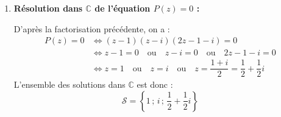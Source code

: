 \documentclass[12pt,a4paper]{article}
\begin{document}
\begin{enumerate}
    Comme $\deg(P) = 3$ et $\deg\left[(z - 1)(z - i)\right] = 2$, le polynôme $g$ est de degré $1$. Il existe donc deux nombres complexes $a$ et $b$ tels que pour tout $z \in \mathbb{C}$, $g(z) = az + b$. Développons $(z - 1)(z - i)(az + b)$ :
    $$
    \begin{aligned}
        (z - 1)(z - i)(az + b) &= \left[z^2 - (1 + i)z + i\right](az + b) \\
        &= az^3 + bz^2 - a(1 + i)z^2 - b(1 + i)z + aiz + bi \\
        &= az^3 + \left[b - a(1 + i)\right]z^2 + \left[ai - b(1 + i)\right]z + bi
    \end{aligned}
    $$
    Par identification avec $P(z) = 2z^3 - 3(1 + i)z^2 + 4iz + 1 - i$, on obtient le système :
    $$
    \begin{aligned}
        \left\{
        \begin{array}{l}
            a = 2 \\
            b - a(1 + i) = -3(1 + i) \\
            ai - b(1 + i) = 4i \\
            bi = 1 - i
        \end{array}
        \right.
        &\iff
        \left\{
        \begin{array}{l}
            a = 2 \\
            b = -3(1 + i) + 2(1 + i) = -(1 + i) = -1 - i \\
            2i - (-1 - i)(1 + i) = 2i + (1 + i)^2 = 2i + 2i = 4i \quad \text{(vérifié)} \\
            (-1 - i)i = -i - i^2 = 1 - i \quad \text{(vérifié)}
        \end{array}
        \right.
    \end{aligned}
    $$
    On en déduit que pour tout $z \in \mathbb{C}$ :
    $$
    g(z) = 2z - 1 - i
    $$

    \item \textbf{Résolution dans $\mathbb{C}$ de l'équation $P(z) = 0$ :}
    
    D'après la factorisation précédente, on a :
    $$
    \begin{aligned}
        P(z) = 0 &\iff (z - 1)(z - i)(2z - 1 - i) = 0 \\
        &\iff z - 1 = 0 \quad \text{ou} \quad z - i = 0 \quad \text{ou} \quad 2z - 1 - i = 0 \\
        &\iff z = 1 \quad \text{ou} \quad z = i \quad \text{ou} \quad z = \dfrac{1 + i}{2} = \dfrac{1}{2} + \dfrac{1}{2}i
    \end{aligned}
    $$
    L'ensemble des solutions dans $\mathbb{C}$ est donc :
    $$
    \mathcal{S} = \left\{ 1 \,;\, i \,;\, \dfrac{1}{2} + \dfrac{1}{2}i \right\}
    $$


\end{enumerate}
\end{document}
